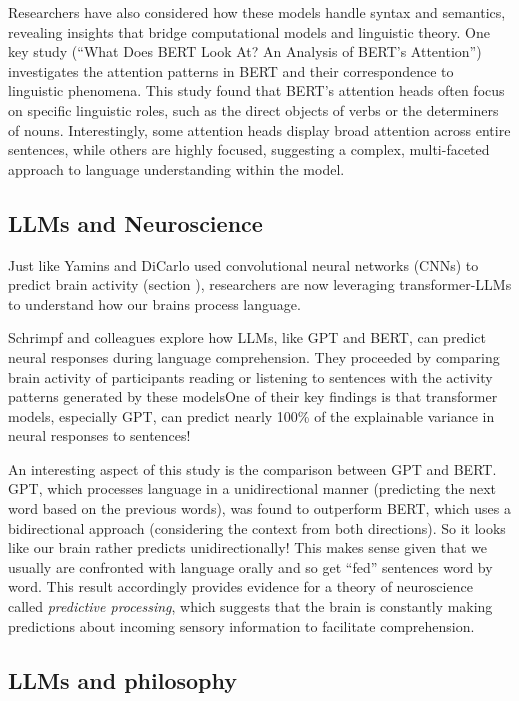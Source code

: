Researchers have also considered how these models handle syntax and semantics, revealing insights that bridge computational models and linguistic theory. One key study (``What Does BERT Look At? An Analysis of BERT's Attention'') investigates the attention patterns in BERT and their correspondence to linguistic phenomena. This study found that BERT's attention heads often focus on specific linguistic roles, such as the direct objects of verbs or the determiners of nouns. Interestingly, some attention heads display broad attention across entire sentences, while others are highly focused, suggesting a complex, multi-faceted approach to language understanding within the model. 

\subsection{LLMs and Neuroscience}

Just like Yamins and DiCarlo used convolutional neural networks (CNNs) to predict brain activity (section ), researchers are now leveraging transformer-LLMs to understand how our brains process language. 

Schrimpf and colleagues \cite{schrimpf2021neural} explore how LLMs, like GPT and BERT, can predict neural responses during language comprehension. They proceeded by comparing  brain activity of participants reading or listening to sentences with the activity patterns generated by these modelsOne of their key findings is that transformer models, especially GPT, can predict nearly 100\% of the explainable variance in neural responses to sentences! 

An interesting aspect of this study is the comparison between GPT and BERT. GPT, which processes language in a unidirectional manner (predicting the next word based on the previous words), was found to outperform BERT, which uses a bidirectional approach (considering the context from both directions). So it looks like our brain rather predicts unidirectionally! This makes sense given that we usually are confronted with language orally and so get ``fed'' sentences word by word. This result accordingly provides evidence for a theory of neuroscience called \emph{predictive processing}, which suggests that the brain is constantly making predictions about incoming sensory information to facilitate comprehension.

\subsection{LLMs and philosophy}

